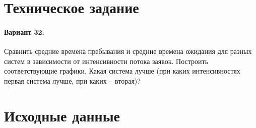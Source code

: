 





\tableofcontents
\listoftables
\listoffigures
\newpage

\section{Техническое задание}

\paragraph{Вариант 32.} 
Сравнить средние времена пребывания и средние времена ожидания для разных систем в зависимости от интенсивности потока заявок. Построить соответствующие графики. Какая система лучше (при каких интенсивностях первая система лучше, при каких – вторая)? 
	
\section{Исходные данные}

